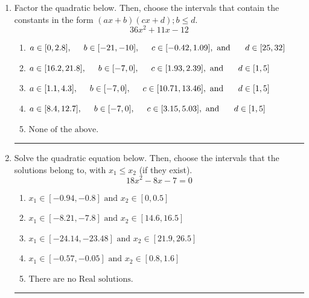 \documentclass[14pt]{extbook}
\newcommand{\litem}[1]{\item#1\hspace*{-1cm}\rule{\textwidth}{0.4pt}}
\begin{document}
\begin{enumerate}
\litem{
Factor the quadratic below. Then, choose the intervals that contain the constants in the form $(ax+b)(cx+d); b \leq d.$\[ 36x^{2} +11 x -12 \]\begin{enumerate}[label=\Alph*.]
\item \( a \in [0, 2.8], \hspace*{5mm} b \in [-21, -10], \hspace*{5mm} c \in [-0.42, 1.09], \text{ and } \hspace*{5mm} d \in [25, 32] \)
\item \( a \in [16.2, 21.8], \hspace*{5mm} b \in [-7, 0], \hspace*{5mm} c \in [1.93, 2.39], \text{ and } \hspace*{5mm} d \in [1, 5] \)
\item \( a \in [1.1, 4.3], \hspace*{5mm} b \in [-7, 0], \hspace*{5mm} c \in [10.71, 13.46], \text{ and } \hspace*{5mm} d \in [1, 5] \)
\item \( a \in [8.4, 12.7], \hspace*{5mm} b \in [-7, 0], \hspace*{5mm} c \in [3.15, 5.03], \text{ and } \hspace*{5mm} d \in [1, 5] \)
\item \( \text{None of the above.} \)

\end{enumerate} }
\litem{
Solve the quadratic equation below. Then, choose the intervals that the solutions belong to, with $x_1 \leq x_2$ (if they exist).\[ 18x^{2} -8 x -7 = 0 \]\begin{enumerate}[label=\Alph*.]
\item \( x_1 \in [-0.94, -0.8] \text{ and } x_2 \in [0, 0.5] \)
\item \( x_1 \in [-8.21, -7.8] \text{ and } x_2 \in [14.6, 16.5] \)
\item \( x_1 \in [-24.14, -23.48] \text{ and } x_2 \in [21.9, 26.5] \)
\item \( x_1 \in [-0.57, -0.05] \text{ and } x_2 \in [0.8, 1.6] \)
\item \( \text{There are no Real solutions.} \)


\end{enumerate}}
\end{enumerate}
\end{document}
